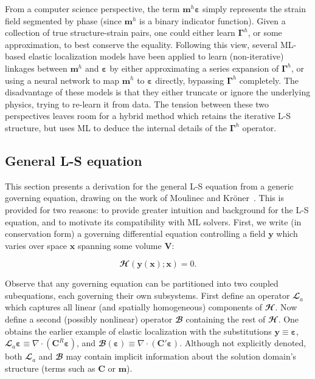 \documentclass[3p, preprint]{elsarticle}
\newcommand{\bmeps}{\bm{\varepsilon}}
\newcommand{\bmgam}{\bm{\Gamma}}
\newcommand{\bmx}{\bm{x}}
\newcommand{\bmm}{\bm{m}}
\newcommand{\bmy}{\bm{y}}
\newcommand{\Linop}{\mathbfcal{L}}
\newcommand{\Aop}{\Linop_a}
\newcommand{\Hop}{\mathbfcal{H}}
\newcommand{\Bop}{\mathbfcal{B}}
\newcommand{\Kroner}{Kröner}
\newenvironment{revision} {} {}
\begin{document}
From a computer science perspective, the term $\bmm^h \bmeps$ simply represents the strain field segmented by phase (since $\bmm^h$ is a binary indicator function). Given a collection of true structure-strain pairs, one could either learn $\bmgam^h$, or some approximation, to best conserve the equality. Following this view, several ML-based elastic localization models \cite{yang2019, landi2010} have been applied to learn (non-iterative) linkages between $\bmm^h$ and $\bmeps$ by either approximating a series expansion of $\bmgam^h$, or using a neural network to map $\bmm^h$ to $\bmeps$ directly, bypassing $\bmgam^h$ completely. The disadvantage of these models is that they either truncate or ignore the underlying physics, trying to re-learn it from data. The tension between these two perspectives leaves room for a hybrid method which retains the iterative L-S structure, but uses ML to deduce the internal details of the $\bmgam^h$ operator.

\subsection{General L-S equation} \label{subsec:generalLS}
This section presents a derivation for the general L-S \begin{revision}equation\end{revision} from a generic governing equation, drawing on the work of Moulinec \cite{moulinec1998} and \Kroner ~\cite{kroner1972}. This is provided for two reasons: to provide greater intuition and background for the L-S equation, and to motivate its compatibility with ML solvers. First, we write (in conservation form) a governing differential equation controlling a field $\bmy$ which varies over space $\bmx$ spanning some volume $\bm{V}$:

\begin{equation}
\Hop(\bmy(\bmx); \bmx) = 0
\label{eq:consform}.
\end{equation}

\noindent Observe that any governing equation can be partitioned into two coupled subequations, each governing their own subsystems. First define an operator $\Aop$ which captures all linear (and spatially homogeneous) components of $\Hop$. Now define a second (possibly nonlinear) operator $\Bop$ containing the rest of $\Hop$. One obtains the earlier example of elastic localization with the substitutions $\bmy \equiv \bmeps$, $\Aop \bmeps \equiv \nabla \cdot (\bm{C}^R \bmeps)$, and $\Bop(\bmeps) \equiv \nabla \cdot (\bm{C}' \bmeps)$. Although not explicitly denoted, both $\Aop$ and $\Bop$ may contain implicit information about the solution domain's structure (terms such as $\bm{C}$ or $\bmm$).
\end{document}
